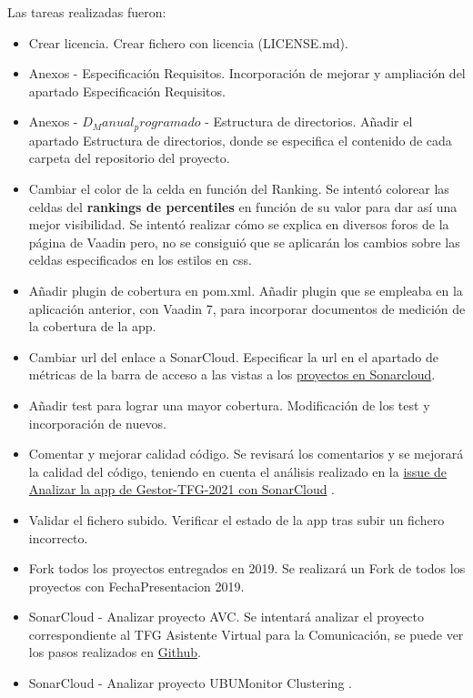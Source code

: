 Las tareas realizadas fueron:
\begin{itemize}
	\tightlist
	\item Crear licencia.
		Crear fichero con licencia (LICENSE.md).
	\item Anexos - Especificación Requisitos.
		Incorporación de mejorar y ampliación del apartado Especificación Requisitos.
	\item Anexos - $D_Manual_programado$ - Estructura de directorios.
		Añadir el apartado Estructura de directorios, donde se especifica el contenido de cada carpeta del repositorio del proyecto.
	\item Cambiar el color de la celda en función del Ranking.
		Se intentó colorear las celdas del \textbf{rankings de percentiles} en función de su valor para dar así una mejor visibilidad. Se intentó realizar cómo se explica en diversos foros de la página de Vaadin pero, no se consiguió que se aplicarán los cambios sobre las celdas especificados en los estilos en css.
	\item Añadir plugin de cobertura en pom.xml.
		Añadir plugin que se empleaba en la aplicación anterior, con Vaadin 7, para incorporar documentos de medición de la cobertura de la app.
	\item Cambiar url del enlace a SonarCloud.
		Especificar la url en el apartado de métricas de la barra de acceso a las vistas a los \href{https://sonarcloud.io/organizations/dbo1001/projects}{proyectos en Sonarcloud}.
	\item Añadir test para lograr una mayor cobertura.
		Modificación de los test y incorporación de nuevos.
	\item Comentar y mejorar calidad código.
		Se revisará los comentarios y se mejorará la calidad del código, teniendo en cuenta el análisis realizado en la \href{https://github.com/dbo1001/Gestor-TFG-2021/issues/142}{issue de Analizar la app de Gestor-TFG-2021 con SonarCloud} . 
	\item Validar el fichero subido.
		Verificar el estado de la app tras subir un fichero incorrecto.
	\item Fork todos los proyectos entregados en 2019.
		Se realizará un Fork de todos los proyectos con FechaPresentacion 2019.
	\item SonarCloud - Analizar proyecto AVC.
		Se intentará analizar el proyecto correspondiente al TFG Asistente Virtual para la Comunicación, se puede ver los pasos realizados en \href{https://github.com/dbo1001/Gestor-TFG-2021/issues/147}{Github}.
	\item SonarCloud - Analizar proyecto UBUMonitor Clustering .

\end{itemize}
